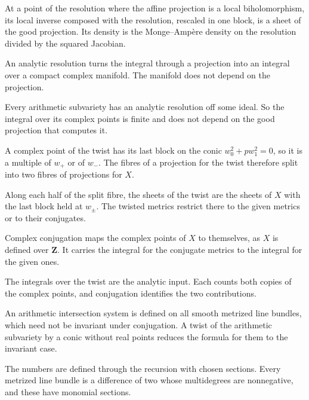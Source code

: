 At a point of the resolution where the affine projection is a local biholomorphism, its local inverse composed with the
resolution, rescaled in one block, is a sheet of the good projection. Its density is the Monge--Amp\`ere density on the
resolution divided by the squared Jacobian.

An analytic resolution turns the integral through a projection into an integral over a compact complex manifold. The
manifold does not depend on the projection.

Every arithmetic subvariety has an analytic resolution off some ideal. So the integral over its complex points is finite
and does not depend on the good projection that computes it.

A complex point of the twist has its last block on the conic $w_0^2+pw_1^2=0$, so it is a multiple of $w_+$ or of $w_-$.
The fibres of a projection for the twist therefore split into two fibres of projections for $X$.

Along each half of the split fibre, the sheets of the twist are the sheets of $X$ with the last block held at $w_\pm$. The
twisted metrics restrict there to the given metrics or to their conjugates.

Complex conjugation maps the complex points of $X$ to themselves, as $X$ is defined over $\mathbf Z$. It carries the
integral for the conjugate metrics to the integral for the given ones.

The integrals over the twist are the analytic input. Each counts both copies of the complex points, and conjugation
identifies the two contributions.

An arithmetic intersection system is defined on all smooth metrized line bundles, which need not be invariant under
conjugation. A twist of the arithmetic subvariety by a conic without real points reduces the formula for them to
the invariant case.

The numbers are defined through the recursion with chosen sections. Every metrized line bundle is a difference of two
whose multidegrees are nonnegative, and these have monomial sections.

